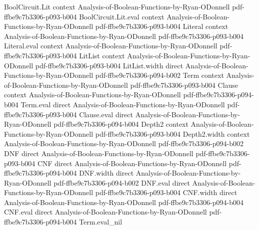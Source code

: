 \begin{theorem}
\leanok
{}
\proofstep
  {BoolCircuit.Lit}
  {context}
  {Analysis-of-Boolean-Functions-by-Ryan-ODonnell}
  {pdf-ffbe9c7b3306-p093-b004}
\proofstep
  {BoolCircuit.Lit.eval}
  {context}
  {Analysis-of-Boolean-Functions-by-Ryan-ODonnell}
  {pdf-ffbe9c7b3306-p093-b004}
\proofstep
  {Literal}
  {context}
  {Analysis-of-Boolean-Functions-by-Ryan-ODonnell}
  {pdf-ffbe9c7b3306-p093-b004}
\proofstep
  {Literal.eval}
  {context}
  {Analysis-of-Boolean-Functions-by-Ryan-ODonnell}
  {pdf-ffbe9c7b3306-p093-b004}
\proofstep
  {LitList}
  {context}
  {Analysis-of-Boolean-Functions-by-Ryan-ODonnell}
  {pdf-ffbe9c7b3306-p093-b004}
\proofstep
  {LitList.width}
  {direct}
  {Analysis-of-Boolean-Functions-by-Ryan-ODonnell}
  {pdf-ffbe9c7b3306-p094-b002}
\proofstep
  {Term}
  {context}
  {Analysis-of-Boolean-Functions-by-Ryan-ODonnell}
  {pdf-ffbe9c7b3306-p093-b004}
\proofstep
  {Clause}
  {context}
  {Analysis-of-Boolean-Functions-by-Ryan-ODonnell}
  {pdf-ffbe9c7b3306-p094-b004}
\proofstep
  {Term.eval}
  {direct}
  {Analysis-of-Boolean-Functions-by-Ryan-ODonnell}
  {pdf-ffbe9c7b3306-p093-b004}
\proofstep
  {Clause.eval}
  {direct}
  {Analysis-of-Boolean-Functions-by-Ryan-ODonnell}
  {pdf-ffbe9c7b3306-p094-b004}
\proofstep
  {Depth2}
  {context}
  {Analysis-of-Boolean-Functions-by-Ryan-ODonnell}
  {pdf-ffbe9c7b3306-p093-b004}
\proofstep
  {Depth2.width}
  {context}
  {Analysis-of-Boolean-Functions-by-Ryan-ODonnell}
  {pdf-ffbe9c7b3306-p094-b002}
\proofstep
  {DNF}
  {direct}
  {Analysis-of-Boolean-Functions-by-Ryan-ODonnell}
  {pdf-ffbe9c7b3306-p093-b004}
\proofstep
  {CNF}
  {direct}
  {Analysis-of-Boolean-Functions-by-Ryan-ODonnell}
  {pdf-ffbe9c7b3306-p094-b004}
\proofstep
  {DNF.width}
  {direct}
  {Analysis-of-Boolean-Functions-by-Ryan-ODonnell}
  {pdf-ffbe9c7b3306-p094-b002}
\proofstep
  {DNF.eval}
  {direct}
  {Analysis-of-Boolean-Functions-by-Ryan-ODonnell}
  {pdf-ffbe9c7b3306-p093-b004}
\proofstep
  {CNF.width}
  {direct}
  {Analysis-of-Boolean-Functions-by-Ryan-ODonnell}
  {pdf-ffbe9c7b3306-p094-b004}
\proofstep
  {CNF.eval}
  {direct}
  {Analysis-of-Boolean-Functions-by-Ryan-ODonnell}
  {pdf-ffbe9c7b3306-p094-b004}
\proofstep
  {Term.eval_nil}

\end{theorem}
